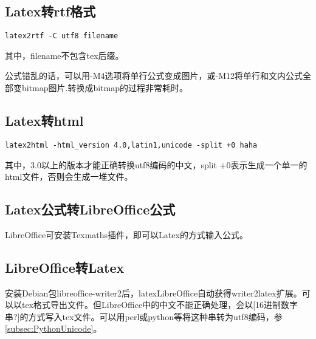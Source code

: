 
\subsection{Latex转rtf格式}
\begin{verbatim}
latex2rtf -C utf8 filename
\end{verbatim}
其中，filename不包含tex后缀。

公式错乱的话，可以用-M4选项将单行公式变成图片，或-M12将单行和文内公式全部变bitmap图片.转换成bitmap的过程非常耗时。

\subsection{Latex转html}
\begin{verbatim}
latex2html -html_version 4.0,latin1,unicode -split +0 haha
\end{verbatim}
其中，3.0以上的版本才能正确转换utf8编码的中文，split +0表示生成一个单一的html文件，否则会生成一堆文件。

\subsection{Latex公式转LibreOffice公式}
LibreOffice可安装Texmaths插件，即可以Latex的方式输入公式。


\subsection{LibreOffice转Latex}
安装Debian包libreoffice-writer2后，latexLibreOffice自动获得writer2latex扩展。可以以tex格式导出文件。但LibreOffice中的中文不能正确处理，会以[16进制数字串?]的方式写入tex文件。可以用perl或python等将这种串转为utf8编码，参\ref{subsec:PythonUnicode}。


